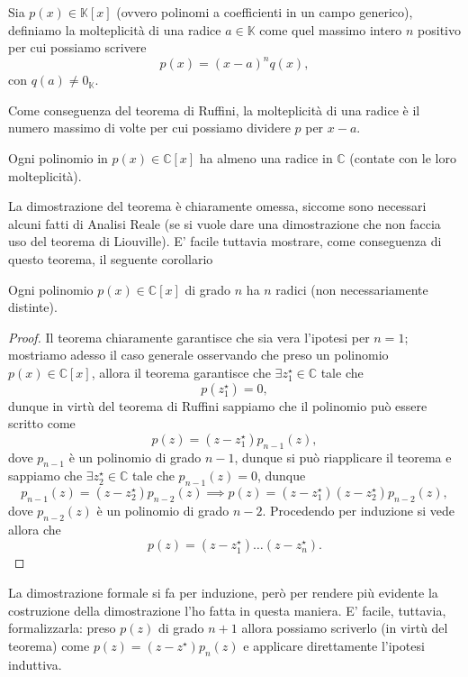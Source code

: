 \begin{definition}
    Sia $p(x) \in \mathbb{K}[x]$ (ovvero polinomi a coefficienti in un campo generico), definiamo la molteplicità di una radice $a \in \mathbb{K}$ come quel massimo intero $n$ positivo per cui possiamo scrivere
    $$
        p(x) = (x-a)^n q(x),
    $$
    con $q(a) \neq 0_\mathbb{K}$.
\end{definition}

Come conseguenza del teorema di Ruffini, la molteplicità di una radice è il numero massimo di volte per cui possiamo dividere $p$ per $x-a$. 

\begin{theorem}
    Ogni polinomio in $p(x) \in \mathbb{C}[x]$ ha almeno una radice in $\mathbb{C}$ (contate con le loro molteplicità).
\end{theorem}
La dimostrazione del teorema è chiaramente omessa, siccome sono necessari alcuni fatti di Analisi Reale (se si vuole dare una dimostrazione che non faccia uso del teorema di Liouville). E' facile tuttavia mostrare, come conseguenza di questo teorema, il seguente corollario

\begin{cor}
    Ogni polinomio $p(x) \in \mathbb{C}[x]$ di grado $n$ ha $n$ radici (non necessariamente distinte).
\end{cor}

\begin{proof}
    Il teorema chiaramente garantisce che sia vera l'ipotesi per $n=1$; mostriamo adesso il caso generale osservando che preso un polinomio $p(x) \in \mathbb{C}[x]$, allora il teorema garantisce che $\exists z^\star_1 \in \mathbb{C}$ tale che
    $$
        p(z_1^\star) = 0,
    $$
    dunque in virtù del teorema di Ruffini sappiamo che il polinomio può essere scritto come
    $$
        p(z) = (z-z_1^\star)p_{n-1}(z),
    $$
    dove $p_{n-1}$ è un polinomio di grado $n-1$, dunque si può riapplicare il teorema e sappiamo che $\exists z_2^\star \in \mathbb{C}$ tale che $p_{n-1}(z) = 0$, dunque
    $$
        p_{n-1}(z) = (z-z_2^\star)p_{n-2}(z) \implies p(z) = (z-z_1^\star)(z-z_2^\star)p_{n-2}(z),
    $$
    dove $p_{n-2}(z)$ è un polinomio di grado $n-2$. Procedendo per induzione si vede allora che
    $$
        p(z) = (z-z_1^\star) \ldots (z-z_n^\star).
    $$
\end{proof}

\begin{remark}
    La dimostrazione formale si fa per induzione, però per rendere più evidente la costruzione della dimostrazione l'ho fatta in questa maniera. E' facile, tuttavia, formalizzarla: preso $p(z)$ di grado $n+1$ allora possiamo scriverlo (in virtù del teorema) come $p(z) = (z-z^\star)p_n(z)$ e applicare direttamente l'ipotesi induttiva.
\end{remark}

